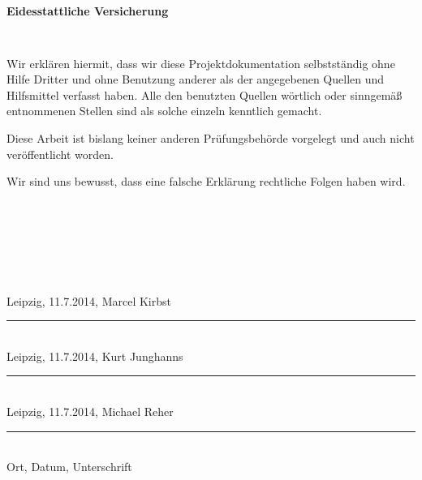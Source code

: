 \documentclass[a4paper,12pt]{article}
\begin{document}
\begin{verbatim}






\end{verbatim}

\begin{center}
\textbf{\LARGE{Eidesstattliche Versicherung}}
\end{center}
\begin{verbatim}


\end{verbatim}

\begin{flushleft}
Wir erklären hiermit, dass wir diese Projektdokumentation selbstständig ohne Hilfe Dritter und ohne Benutzung anderer als der angegebenen Quellen und Hilfsmittel verfasst haben. Alle den benutzten Quellen wörtlich oder sinngemäß entnommenen Stellen sind als solche einzeln kenntlich gemacht.

Diese Arbeit ist bislang keiner anderen Prüfungsbehörde vorgelegt und auch nicht veröffentlicht worden.

Wir sind uns bewusst, dass eine falsche Erklärung rechtliche Folgen haben wird. 
\begin{verbatim}







\end{verbatim}
Leipzig, 11.7.2014, Marcel Kirbst
\hrule width .6\hsize\ \\
Leipzig, 11.7.2014, Kurt Junghanns
\hrule width .6\hsize\ \\
Leipzig, 11.7.2014, Michael Reher
\hrule width .6\hsize\ \\
Ort, Datum, Unterschrift
\end{flushleft}
\end{document}
